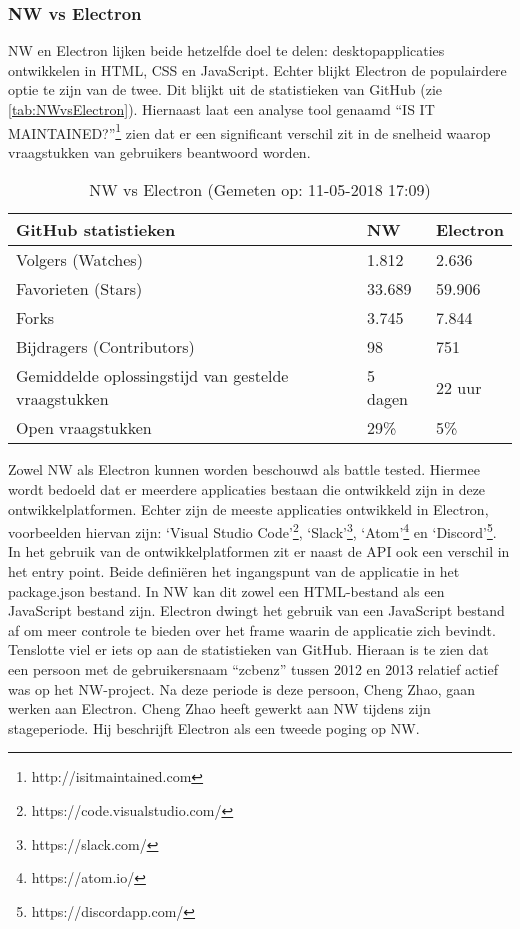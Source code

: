 \subsubsection{NW vs Electron}
NW en Electron lijken beide hetzelfde doel te delen: desktopapplicaties ontwikkelen in HTML, CSS en JavaScript. Echter blijkt Electron de populairdere optie te zijn van de twee. Dit blijkt uit de statistieken van GitHub (zie \autoref{tab:NWvsElectron}). Hiernaast laat een analyse tool genaamd “IS IT MAINTAINED?”\footnote{http://isitmaintained.com} zien dat er een significant verschil zit in de snelheid waarop vraagstukken van gebruikers beantwoord worden.

\begin{table}[htb]
    \centering
    \begin{tabular}{ | l | l | l | }
        \hline
        GitHub statistieken & \textbf{NW} & \textbf{Electron} \\
        \hline
        Volgers (Watches) & 1.812 & \cellcolor{green!15}2.636 \\
        \hline
        Favorieten (Stars) & 33.689 & \cellcolor{green!15}59.906 \\
        \hline
        Forks & 3.745 & \cellcolor{green!15}7.844 \\
        \hline
        Bijdragers (Contributors) & 98 & \cellcolor{green!15}751 \\
        \hline
        Gemiddelde oplossingstijd van gestelde vraagstukken & \cellcolor{orange!25}5 dagen & \cellcolor{green!15}22 uur \\
        \hline
        Open vraagstukken & \cellcolor{red!25}29\% & \cellcolor{green!15}5\% \\ 
        \hline
    \end{tabular}
    \caption{NW vs Electron (Gemeten op: 11-05-2018 17:09)}    
    \label{tab:NWvsElectron}
\end{table}

Zowel NW als Electron kunnen worden beschouwd als battle tested\cite{NWJSApps}\cite{ElectronApps}. Hiermee wordt bedoeld dat er meerdere applicaties bestaan die ontwikkeld zijn in deze ontwikkelplatformen. Echter zijn de meeste applicaties ontwikkeld in Electron, voorbeelden hiervan zijn: ‘Visual Studio Code’\footnote{https://code.visualstudio.com/}, ‘Slack’\footnote{https://slack.com/}, ‘Atom’\footnote{https://atom.io/} en ‘Discord’\footnote{https://discordapp.com/}.
In het gebruik van de ontwikkelplatformen zit er naast de API ook een verschil in het entry point. Beide definiëren het ingangspunt van de applicatie in het package.json bestand. In NW kan dit zowel een HTML-bestand als een JavaScript bestand zijn. Electron dwingt het gebruik van een JavaScript bestand af om meer controle te bieden over het frame waarin de applicatie zich bevindt.
Tenslotte viel er iets op aan de statistieken van GitHub. Hieraan is te zien dat een persoon met de gebruikersnaam “zcbenz” tussen 2012 en 2013 relatief actief was op het NW-project. Na deze periode is deze persoon, Cheng Zhao, gaan werken aan Electron. Cheng Zhao heeft gewerkt aan NW tijdens zijn stageperiode. Hij beschrijft Electron als een tweede poging op NW\cite{FromNWToElectronZhaoCheng}. 


